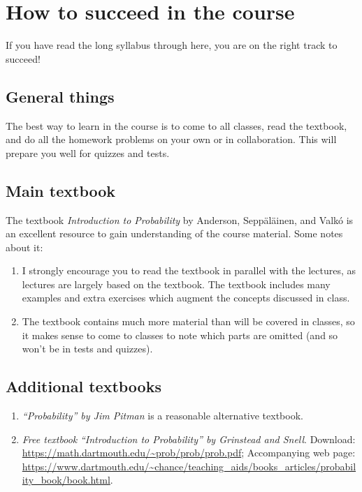 \documentclass[oneside,11pt]{amsart}
\begin{document}
\section{How to succeed in the course}
\label{success}

If you have read the long syllabus through here, you are on the right
track to succeed!

\subsection{General things}

The best way to learn in the course is to 
come to all classes, read the textbook,
and do all the homework problems on your own or in collaboration.
This will prepare you well for quizzes and tests.

\subsection{Main textbook}

The textbook \emph{Introduction to Probability} by Anderson, Sepp\"al\"ainen, and Valk\'o 
is 
an excellent resource 
to gain understanding of the course material. Some notes about it:

\begin{enumerate}[$\bullet$]
	\item I strongly encourage you to read the textbook in parallel with 
		the lectures, as lectures are largely based on the textbook.
		The textbook includes many examples and
		extra exercises which augment the concepts discussed in class.
	\item The textbook contains much more material than will be covered in classes, so it
		makes sense to come to classes to note which parts are omitted
		(and so won't be in tests and quizzes).
\end{enumerate}

\subsection{Additional textbooks}

\begin{enumerate}[$\bullet$]
	\item 
		\emph{``Probability'' by Jim Pitman} is a reasonable alternative textbook.
	\item 
		\emph{Free textbook} 
		\emph{``Introduction to Probability'' by Grinstead and Snell}.
			Download: \url{https://math.dartmouth.edu/~prob/prob/prob.pdf};
			Accompanying web page: \url{https://www.dartmouth.edu/~chance/teaching_aids/books_articles/probability_book/book.html}.
\end{enumerate}
\end{document}
